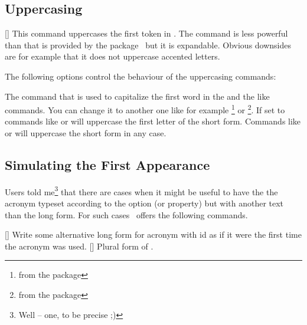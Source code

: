 \documentclass{acro-manual}
\begin{document}
\subsection{Uppercasing}
\begin{commands}
  []
     This command uppercases the first token in .  The
     command is less powerful than  that is provided by the
      package~\cite{pkg:mfirstuc} but it is expandable.  Obvious
     downsides are for example that it does not uppercase accented letters.
\end{commands}
The following options control the behaviour of the uppercasing commands:
\begin{options}
    The command that is used to capitalize the first word in the  and
    the like commands.  You can change it to another one like for example
    \footnote{from the  package} or
    \footnote{from the  package}.
    If set to  commands like  or 
    will uppercase the first letter of the short form.  Commands like 
    or  will uppercase the short form in any case.
\end{options}

\subsection{Simulating the First Appearance}\label{sec:simul-first-appe}
Users told me\footnote{Well -- one, to be precise ;)} that there are cases
when it might be useful to have the the acronym typeset according to the
 option (or  property) but with
another text than the long form.  For such cases \acro\ offers the following
commands.
\begin{commands}
  [\sarg{}]
    Write some alternative long form for acronym with \acs{id}  as if
    it were the first time the acronym was used.
  [\sarg{}]
    Plural form of .
\end{commands}

\begin{example}
\end{example}
\end{document}
